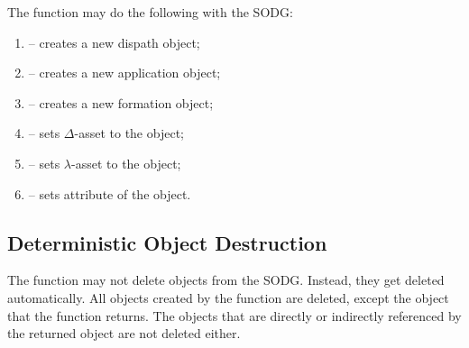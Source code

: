 The function may do the following with the SODG:
\begin{enumerate}
  \item {} -- creates a new dispath object;
  \item {} -- creates a new application object;
  \item {} -- creates a new formation object;
  \item {} -- sets \(\Delta\)-asset to the object;
  \item {} -- sets \(\lambda\)-asset to the object;
  \item {} -- sets attribute of the object.
\end{enumerate}

\subsection{Deterministic Object Destruction}

The function may not delete objects from the SODG.
Instead, they get deleted automatically.
All objects created by the function are deleted, except the object that the function returns.
The objects that are directly or indirectly referenced by the returned object are not deleted either.

